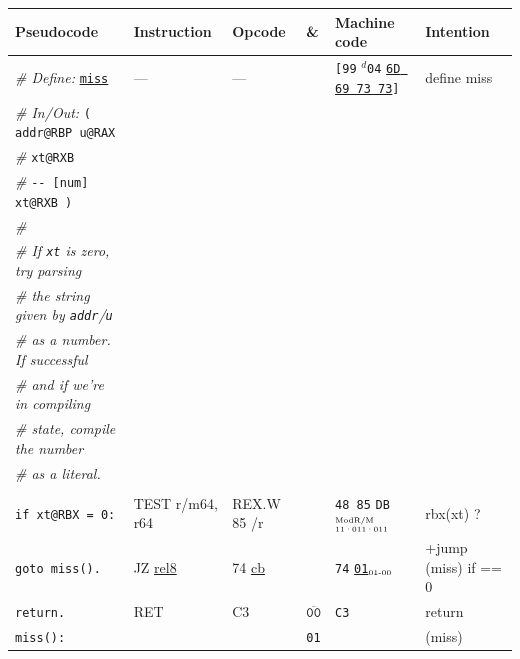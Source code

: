 \documentclass[a4paper,12pt,final]{article}
\begin{document}
\begin{table}[!htbp] \begin{adjustwidth}{-1cm}{-1cm} \fontsize{10}{12.000000}\selectfont
\begin{center}
\begin{tabular}{l|ll|l|lH}
\textbf{Pseudocode} & \textbf{Instruction} & \textbf{Opcode} & \textbf{\&} & \textbf{Machine code} & \textbf{Intention}\\[0pt]
\hline
\emph{\# Define:} \uline{\texttt{miss}} & --- & --- &  & \texttt{[99} \(^{d}\)​\texttt{04} \uline{\texttt{6D 69 73 73}}​\texttt{]} & define miss\\[0pt]
\emph{\# In/Out:}     \texttt{( addr@RBP u@RAX} &  &  &  &  & \\[0pt]
\emph{\#}\hspace{4.9em}       \texttt{xt@RXB} &  &  &  &  & \\[0pt]
\emph{\#}\hspace{3.35em} \texttt{-​- [num] xt@RXB )} &  &  &  &  & \\[0pt]
\emph{\#} &  &  &  &  & \\[0pt]
\emph{\# If \texttt{xt} is zero, try parsing} &  &  &  &  & \\[0pt]
\emph{\# the string given by \texttt{addr}​/​\texttt{u}} &  &  &  &  & \\[0pt]
\emph{\# as a number. If successful} &  &  &  &  & \\[0pt]
\emph{\# and if we're in compiling} &  &  &  &  & \\[0pt]
\emph{\# state, compile the number} &  &  &  &  & \\[0pt]
\emph{\# as a literal.} &  &  &  &  & \\[0pt]
 &  &  &  &  & \\[0pt]
\hspace{1.053000em} \texttt{if xt@RBX = 0:} & TEST r/m64, r64 & REX.W 85 /r &  & \texttt{48 85} \texttt{DB}​\(^{\text{\tiny ModR/M}}_{\text{\tiny 11·011·011}}\) & rbx(xt) ?\\[0pt]
\hspace{2.106000em}   \texttt{goto miss().} & JZ \uline{rel8} & 74 \uline{cb} &  & \texttt{74} \uline{\texttt{01}}​\(_{\text{\tiny 01-00}}\) & +jump (miss) if == 0\\[0pt]
\hspace{1.053000em} \texttt{return.} & RET & C3 & \(\overline{\texttt{00}}\) & \texttt{C3} & return\\[0pt]
\texttt{miss():} &  &  & \texttt{01} &  & (miss)\\[0pt]

\end{tabular}
\end{center}
\end{adjustwidth}
\end{table}
\end{document}
